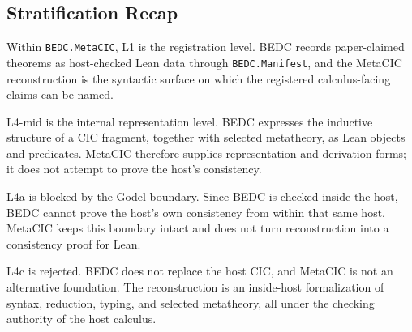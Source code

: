 \subsection{Stratification Recap}\label{subsec:reconstruction-stratification-recap}

Within \texttt{BEDC.MetaCIC}, L1 is the registration level. BEDC records
paper-claimed theorems as host-checked Lean data through
\texttt{BEDC.Manifest}, and the MetaCIC reconstruction is the syntactic
surface on which the registered calculus-facing claims can be named.

L4-mid is the internal representation level. BEDC expresses the inductive
structure of a CIC fragment, together with selected metatheory, as Lean
objects and predicates. MetaCIC therefore supplies representation and
derivation forms; it does not attempt to prove the host's consistency.

L4a is blocked by the Godel boundary. Since BEDC is checked inside the host,
BEDC cannot prove the host's own consistency from within that same host.
MetaCIC keeps this boundary intact and does not turn reconstruction into a
consistency proof for Lean.

L4c is rejected. BEDC does not replace the host CIC, and MetaCIC is not an
alternative foundation. The reconstruction is an inside-host formalization of
syntax, reduction, typing, and selected metatheory, all under the checking
authority of the host calculus.
